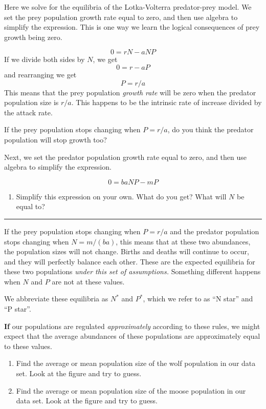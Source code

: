 \documentclass[
  letterpaper,
  DIV=11,
  numbers=noendperiod]{scrreprt}
\providecommand{\tightlist}{%
  \setlength{\itemsep}{0pt}\setlength{\parskip}{0pt}}
\begin{document}
Here we solve for the equilibria of the Lotka-Volterra predator-prey
model. We set the prey population growth rate equal to zero, and then
use algebra to simplify the expression. This is one way we learn the
logical consequences of prey growth being zero.

\[0 = rN-aNP\] If we divide both sides by \(N\), we get \[0 = r-aP\] and
rearranging we get \[P=r/a\] This means that the prey population
\emph{growth rate} will be zero when the predator population size is
\(r/a\). This happens to be the intrinsic rate of increase divided by
the attack rate.

If the prey population stops changing when \(P=r/a\), do you think the
predator population will stop growth too?

Next, we set the predator population growth rate equal to zero, and then
use algebra to simplify the expression.

\[0 = baNP - mP\]

\begin{enumerate}
\def\labelenumi{\arabic{enumi}.}
\setcounter{enumi}{2}
\tightlist
\item
  Simplify this expression on your own. What do you get? What will \(N\)
  be equal to?
\end{enumerate}

\begin{center}\rule{0.5\linewidth}{0.5pt}\end{center}

If the prey population stops changing when \(P=r/a\) and the predator
population stops changing when \(N=m/(ba)\), this means that at these
two abundances, the population sizes will not change. Births and deaths
will continue to occur, and they will perfectly balance each other.
These are the expected equilibria for these two populations \emph{under
this set of assumptions.} Something different happens when \(N\) and
\(P\) are not at these values.

We abbreviate these equilibria as \(N^*\) and \(P^*\), which we refer to
as ``N star'' and ``P star''.

\textbf{If} our populations are regulated \emph{approximately} according
to these rules, we might expect that the average abundances of these
populations are approximately equal to these values.

\begin{enumerate}
\def\labelenumi{\arabic{enumi}.}
\setcounter{enumi}{3}
\item
  Find the average or mean population size of the wolf population in our
  data set. Look at the figure and try to guess.
\item
  Find the average or mean population size of the moose population in
  our data set. Look at the figure and try to guess.
\end{enumerate}
\end{document}
